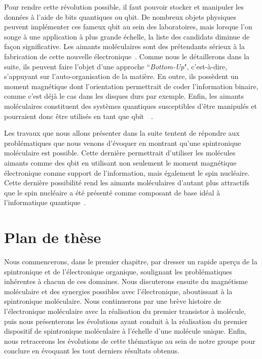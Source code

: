 Pour rendre cette révolution possible, il faut pouvoir stocker et manipuler les données à l'aide de bits quantiques ou qbit. De nombreux objets physiques peuvent implémenter ces fameux qbit au sein des laboratoires, mais lorsque l'on songe à une application à plus grande échelle, la liste des candidats diminue de façon significative. Les aimants moléculaires sont des prétendants sérieux à la fabrication de cette nouvelle électronique~\cite{Bogani2008,Sanvito2011}. Comme nous le détaillerons dans la suite, ils peuvent faire l'objet d'une approche ``\textit{Bottom-Up}", c'est-à-dire, s'appuyant sur l'auto-organisation de la matière. En outre, ils possèdent un moment magnétique dont l'orientation permettrait de coder l'information binaire, comme c'est déjà le cas dans les disques durs par exemple. Enfin, les aimants moléculaires constituent des systèmes quantiques susceptibles d'\^etre manipulés et pourraient donc \^etre utilisés en tant que qbit~~\cite{Leuenberger2001,Bertaina2008,Schlegel2008}.

Les travaux que nous allons présenter dans la suite tentent de répondre aux problématiques que nous venons d'évoquer en montrant qu'une spintronique moléculaire est possible. Cette dernière permettrait d'utiliser les molécules aimants comme des qbit en utilisant non seulement le moment magnétique électronique comme support de l'information, mais également le spin nucléaire. Cette dernière possibilité rend les aimants moléculaires d'autant plus attractifs que le spin nucléaire a été présenté comme composant de base idéal à l'informatique quantique~\cite{Kane1998,Vandersypen2001,Leuenberger2003}.

\newpage
 
\section*{Plan de thèse}

Nous commencerons, dans le premier chapitre, par dresser un rapide aperçu de la spintronique et de l'électronique organique, soulignant les problématiques inhérentes à  chacun de ces domaines. Nous discuterons ensuite du magnétisme moléculaire et des synergies possibles avec l'électronique, aboutissant à la spintronique moléculaire. Nous continuerons par une brève histoire de l'électronique moléculaire avec la réalisation du premier transistor à molécule, puis nous présenterons les évolutions ayant conduit à la réalisation du premier dispositif de spintronique moléculaire à l'échelle d'une molécule unique. Enfin, nous retracerons les évolutions de cette thématique au sein de notre groupe pour conclure en évoquant les tout derniers résultats obtenus.


